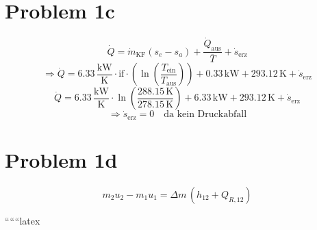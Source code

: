 \section*{Problem 1c}
\[
\dot{Q} = \dot{m}_{\text{KF}} (s_e - s_a) + \frac{\dot{Q}_{\text{aus}}}{\overline{T}} + \dot{s}_{\text{erz}}
\]
\[
\Rightarrow \dot{Q} = 6.33 \, \frac{\text{kW}}{\text{K}} \cdot \text{if} \cdot \left( \ln \left( \frac{T_{\text{ein}}}{T_{\text{aus}}} \right) \right) + 0.33 \, \text{kW} + 293.12 \, \text{K} + \dot{s}_{\text{erz}}
\]
\[
\dot{Q} = 6.33 \, \frac{\text{kW}}{\text{K}} \cdot \ln \left( \frac{288.15 \, \text{K}}{278.15 \, \text{K}} \right) + 6.33 \, \text{kW} + 293.12 \, \text{K} + \dot{s}_{\text{erz}}
\]
\[
\Rightarrow \dot{s}_{\text{erz}} = 0 \quad \text{da kein Druckabfall}
\]

\section*{Problem 1d}
\[
m_2 u_2 - m_1 u_1 = \Delta m \, (h_{12} + Q_{R,12})
\]

``````latex


